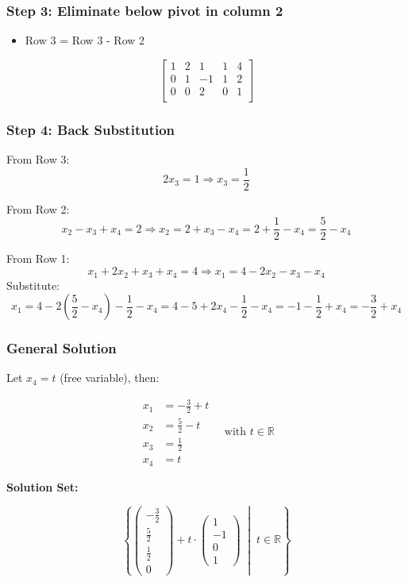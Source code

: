 \subsubsection*{Step 3: Eliminate below pivot in column 2}

\begin{itemize}[label=\(-\)]
	\item Row 3 = Row 3 - Row 2
\end{itemize}

\[
	\begin{bmatrix}
		1 & 2 & 1  & 1 & 4 \\
		0 & 1 & -1 & 1 & 2 \\
		0 & 0 & 2  & 0 & 1 \\
	\end{bmatrix}
\]

\subsubsection*{Step 4: Back Substitution}

From Row 3:
\[
	2x_3 = 1 \Rightarrow x_3 = \frac{1}{2}
\]

From Row 2:
\[
	x_2 - x_3 + x_4 = 2 \Rightarrow x_2 = 2 + x_3 - x_4 = 2 + \frac{1}{2} - x_4 = \frac{5}{2} - x_4
\]

From Row 1:
\[
	x_1 + 2x_2 + x_3 + x_4 = 4
	\Rightarrow x_1 = 4 - 2x_2 - x_3 - x_4
\]
Substitute:
\[
	x_1 = 4 - 2\left( \frac{5}{2} - x_4 \right) - \frac{1}{2} - x_4
	= 4 - 5 + 2x_4 - \frac{1}{2} - x_4
	= -1 - \frac{1}{2} + x_4 = -\frac{3}{2} + x_4
\]

\subsubsection*{General Solution}

Let \(x_4 = t\) (free variable), then:

\[
	\begin{aligned}
		x_1 & = -\frac{3}{2} + t \\
		x_2 & = \frac{5}{2} - t  \\
		x_3 & = \frac{1}{2}      \\
		x_4 & = t
	\end{aligned}
	\quad \text{with } t \in \mathbb{R}
\]

\textbf{Solution Set:}

\[
	\left\{
	\begin{pmatrix}
		-\frac{3}{2} \\ \frac{5}{2} \\ \frac{1}{2} \\ 0
	\end{pmatrix}
	+ t \cdot
	\begin{pmatrix}
		1 \\ -1 \\ 0 \\ 1
	\end{pmatrix}
	\;\middle|\; t \in \mathbb{R}
	\right\}
\]

